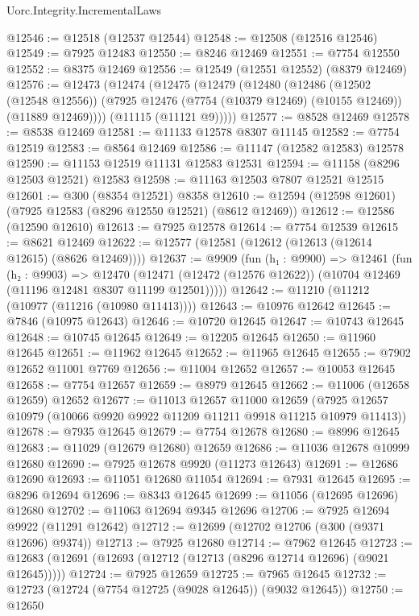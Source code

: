 \begin{lexlean}{Uorc.Integrity.IncrementalLaws}
\begin{coremodule}
@12546 := @12518 (@12537 @12544)
@12548 := @12508 (@12516 @12546)
@12549 := @7925 @12483
@12550 := @8246 @12469
@12551 := @7754 @12550
@12552 := @8375 @12469
@12556 := @12549 (@12551 @12552) (@8379 @12469)
@12576 := @12473
    (@12474
      (@12475
        (@12479
          (@12480
            (@12486
              (@12502 (@12548 @12556))
              (@7925 @12476 (@7754 (@10379 @12469) (@10155 @12469)) (@11889 @12469))))
          (@11115 (@11121 @9)))))
@12577 := @8528 @12469
@12578 := @8538 @12469
@12581 := @11133 @12578 @8307 @11145
@12582 := @7754 @12519
@12583 := @8564 @12469
@12586 := @11147 (@12582 @12583) @12578
@12590 := @11153 @12519 @11131 @12583 @12531
@12594 := @11158 (@8296 @12503 @12521) @12583
@12598 := @11163 @12503 @7807 @12521 @12515
@12601 := @300 (@8354 @12521) @8358
@12610 := @12594 (@12598 @12601) (@7925 @12583 (@8296 @12550 @12521) (@8612 @12469))
@12612 := @12586 (@12590 @12610)
@12613 := @7925 @12578
@12614 := @7754 @12539
@12615 := @8621 @12469
@12622 := @12577 (@12581 (@12612 (@12613 (@12614 @12615) (@8626 @12469))))
@12637 := @9909
    (fun (h₁ : @9900) =>
    @12461
      (fun (h₂ : @9903) =>
      @12470 (@12471 (@12472 (@12576 @12622)) (@10704 @12469 (@11196 @12481 @8307 @11199 @12501)))))
@12642 := @11210 (@11212 (@10977 (@11216 (@10980 @11413))))
@12643 := @10976 @12642
@12645 := @7846 (@10975 @12643)
@12646 := @10720 @12645
@12647 := @10743 @12645
@12648 := @10745 @12645
@12649 := @12205 @12645
@12650 := @11960 @12645
@12651 := @11962 @12645
@12652 := @11965 @12645
@12655 := @7902 @12652 @11001 @7769
@12656 := @11004 @12652
@12657 := @10053 @12645
@12658 := @7754 @12657
@12659 := @8979 @12645
@12662 := @11006 (@12658 @12659) @12652
@12677 := @11013
    @12657
    @11000
    @12659
    (@7925 @12657 @10979 (@10066 @9920 @9922 @11209 @11211 @9918 @11215 @10979 @11413))
@12678 := @7935 @12645
@12679 := @7754 @12678
@12680 := @8996 @12645
@12683 := @11029 (@12679 @12680) @12659
@12686 := @11036 @12678 @10999 @12680
@12690 := @7925 @12678 @9920 (@11273 @12643)
@12691 := @12686 @12690
@12693 := @11051 @12680 @11054
@12694 := @7931 @12645
@12695 := @8296 @12694
@12696 := @8343 @12645
@12699 := @11056 (@12695 @12696) @12680
@12702 := @11063 @12694 @9345 @12696
@12706 := @7925 @12694 @9922 (@11291 @12642)
@12712 := @12699 (@12702 @12706 (@300 (@9371 @12696) @9374))
@12713 := @7925 @12680
@12714 := @7962 @12645
@12723 := @12683 (@12691 (@12693 (@12712 (@12713 (@8296 @12714 @12696) (@9021 @12645)))))
@12724 := @7925 @12659
@12725 := @7965 @12645
@12732 := @12723 (@12724 (@7754 @12725 (@9028 @12645)) (@9032 @12645))
@12750 := @12650

\end{coremodule}
\end{lexlean}
